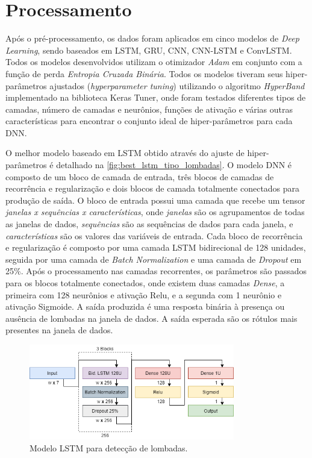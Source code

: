 \section{Processamento}

Após o pré-processamento, os dados foram aplicados em cinco modelos de \textit{Deep Learning}, sendo baseados em LSTM, GRU, CNN, CNN-LSTM e ConvLSTM. Todos os modelos desenvolvidos utilizam o otimizador \emph{Adam} em conjunto com a função de perda \emph{Entropia Cruzada Binária}. Todos os modelos tiveram seus hiper-parâmetros ajustados (\textit{hyperparameter tuning}) utilizando o algoritmo \textit{HyperBand} implementado na biblioteca Keras Tuner, onde foram testados diferentes tipos de camadas, número de camadas e neurônios, funções de ativação e várias outras características para encontrar o conjunto ideal de hiper-parâmetros para cada DNN. 

O melhor modelo baseado em LSTM obtido através do ajuste de hiper-parâmetros é detalhado na \autoref{fig:best_lstm_tipo_lombadas}. O modelo DNN é composto de um bloco de camada de entrada, três blocos de camadas de recorrência e regularização e dois blocos de camada totalmente conectados para produção de saída. O bloco de entrada possui uma camada que recebe um tensor \emph{janelas x sequências x características}, onde \emph{janelas} são os agrupamentos de todas as janelas de dados, \emph{sequências} são as sequências de dados para cada janela, e \emph{características} são os valores das variáveis de entrada. Cada bloco de recorrência e regularização é composto por uma camada LSTM bidirecional de 128 unidades, seguida por uma camada de \textit{Batch Normalization} e uma camada de \textit{Dropout} em 25\%. Após o processamento nas camadas recorrentes, os parâmetros são passados para os blocos totalmente conectados, onde existem duas camadas \textit{Dense}, a primeira com 128 neurônios e ativação Relu, e a segunda com 1 neurônio e ativação Sigmoide. A saída produzida é uma resposta binária à presença ou ausência de lombadas na janela de dados. A saída esperada são os rótulos mais presentes na janela de dados.

\begin{figure}[h!]
  \centering
  \caption{Modelo LSTM para detecção de lombadas.}
  \label{fig:best_lstm_tipo_lombadas}
  \includegraphics[width=0.8\textwidth]{figuras/fig_40.png}
\end{figure}

